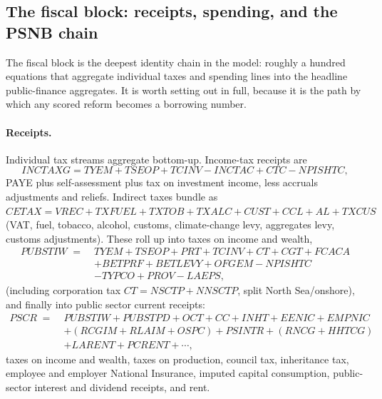 \subsection{The fiscal block: receipts, spending, and the PSNB chain}
\label{sec:fiscal}

The fiscal block is the deepest identity chain in the model: roughly a hundred equations that aggregate individual taxes and spending lines into the headline public-finance aggregates. It is worth setting out in full, because it is the path by which any scored reform becomes a borrowing number.

\paragraph{Receipts.} Individual tax streams aggregate bottom-up. Income-tax receipts are
\begin{equation}
INCTAXG = TYEM + TSEOP + TCINV - INCTAC + CTC - NPISHTC,
\label{eq:inctax}
\end{equation}
PAYE plus self-assessment plus tax on investment income, less accruals adjustments and reliefs. Indirect taxes bundle as $CETAX = VREC + TXFUEL + TXTOB + TXALC + CUST + CCL + AL + TXCUS$ (VAT, fuel, tobacco, alcohol, customs, climate-change levy, aggregates levy, customs adjustments). These roll up into taxes on income and wealth,
\begin{equation}
\begin{aligned}
PUBSTIW \;=\;& TYEM + TSEOP + PRT + TCINV + CT + CGT + FCACA \\
&+ BETPRF + BETLEVY + OFGEM - NPISHTC \\
&- TYPCO + PROV - LAEPS,
\end{aligned}
\label{eq:pubstiw}
\end{equation}
(including corporation tax $CT = NSCTP + NNSCTP$, split North Sea/onshore), and finally into public sector current receipts:
\begin{equation}
\begin{aligned}
PSCR \;=\;& PUBSTIW + PUBSTPD + OCT + CC + INHT + EENIC + EMPNIC \\
&+ (RCGIM + RLAIM + OSPC) + PSINTR + (RNCG + HHTCG) \\
&+ LARENT + PCRENT + \cdots,
\end{aligned}
\label{eq:pscr}
\end{equation}
taxes on income and wealth, taxes on production, council tax, inheritance tax, employee and employer National Insurance, imputed capital consumption, public-sector interest and dividend receipts, and rent.

